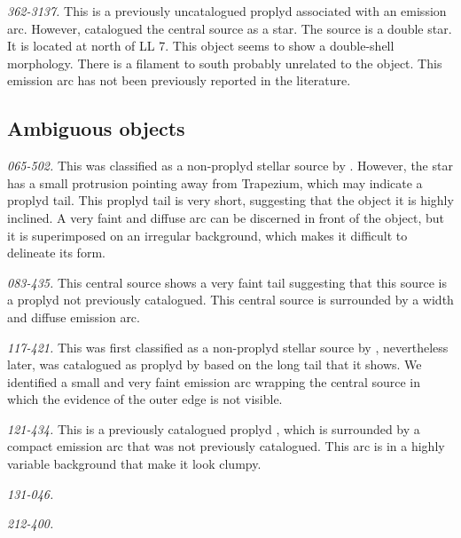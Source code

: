 \documentclass[iop, apj]{emulateapj}
\begin{document}
\textit{362-3137.} This is a previously uncatalogued proplyd associated with an emission arc. However, \citet{Da-Rio:2009a} catalogued the central source as a star. The source is a double star. It is located at north of LL 7. This object seems to show a double-shell morphology. There is a filament to south probably unrelated to the object. This emission arc has not been previously reported in the literature. 

\subsection{Ambiguous objects}
\label{sec:problematic-objects}

\textit{065-502.} This was classified as a non-proplyd stellar source
by \citet{ODell:1996a}. However, the star has a small protrusion
pointing away from Trapezium, which may indicate a proplyd tail. This
proplyd tail is very short, suggesting that the object it is highly
inclined.  A very faint and diffuse arc can be discerned in front of
the object, but it is superimposed on an irregular background, which
makes it difficult to delineate its form.

\textit{083-435.} This central source shows a very faint tail
suggesting that this source is a proplyd not previously
catalogued. This central source is surrounded by a width and diffuse
emission arc.

\textit{117-421.} This was first classified as a non-proplyd stellar
source by \citet{ODell:1996a}, nevertheless later, was catalogued as
proplyd by \citet{Ricci:2008a} based on the long tail that it
shows. We identified a small and very faint emission arc wrapping the
central source in which the evidence of the outer edge is not visible.

\textit{121-434.} This is a previously catalogued proplyd
\citep{Ricci:2008a}, which is surrounded by a compact emission arc
that was not previously catalogued. This arc is in a highly variable
background that make it look clumpy.


\textit{131-046.} 

\textit{212-400.}
\end{document}
